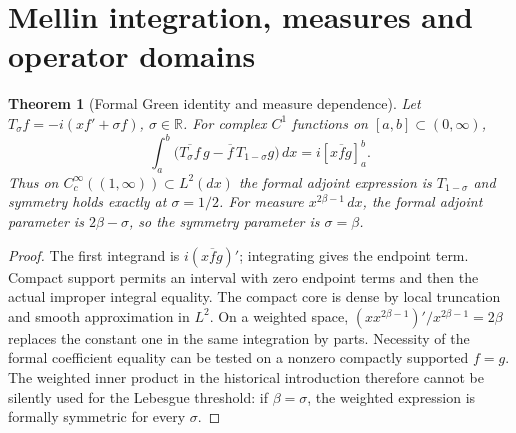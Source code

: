 \documentclass[11pt]{article}
\theoremstyle{readable}
\newtheorem{theorem}{Theorem}[section]
\theoremstyle{remark}\newtheorem{remark}[theorem]{Remark}
\newcommand{\R}{\mathbb R}\newcommand{\C}{\mathbb C}\newcommand{\Z}{\mathbb Z}
\newcommand{\dd}{\,d}\newcommand{\norm}[1]{\left\lVert#1\right\rVert}
\begin{document}
\section{Mellin integration, measures and operator domains}\label{sec:mellin}
\begin{theorem}[Formal Green identity and measure dependence]
Let $T_\sigma f=-i(xf'+\sigma f)$, $\sigma\in\R$. For complex $C^1$
functions on $[a,b]\subset(0,\infty)$,
\[
 \int_a^b\bigl(\overline{T_\sigma f}\,g-\overline f\,T_{1-\sigma}g\bigr)\dd x
 =i[x\overline f g]_a^b.
\]
Thus on $C_c^\infty((1,\infty))\subset L^2(dx)$ the formal adjoint
expression is $T_{1-\sigma}$ and symmetry holds exactly at $\sigma=1/2$.
For measure $x^{2\beta-1}\dd x$, the formal adjoint parameter is
$2\beta-\sigma$, so the symmetry parameter is $\sigma=\beta$.
\end{theorem}
\begin{proof}
The first integrand is $i(x\overline f g)'$; integrating gives the endpoint
term. Compact support permits an interval with zero endpoint terms and
then the actual improper integral equality. The compact core is dense by
local truncation and smooth approximation in $L^2$. On a weighted space,
$ (x x^{2\beta-1})'/x^{2\beta-1}=2\beta$ replaces the constant one in
the same integration by parts. Necessity of the formal coefficient equality
can be tested on a nonzero compactly supported $f=g$. The weighted inner
product in the historical introduction therefore cannot be silently used
for the Lebesgue threshold: if $\beta=\sigma$, the weighted expression is
formally symmetric for every $\sigma$.
\end{proof}
\end{document}
